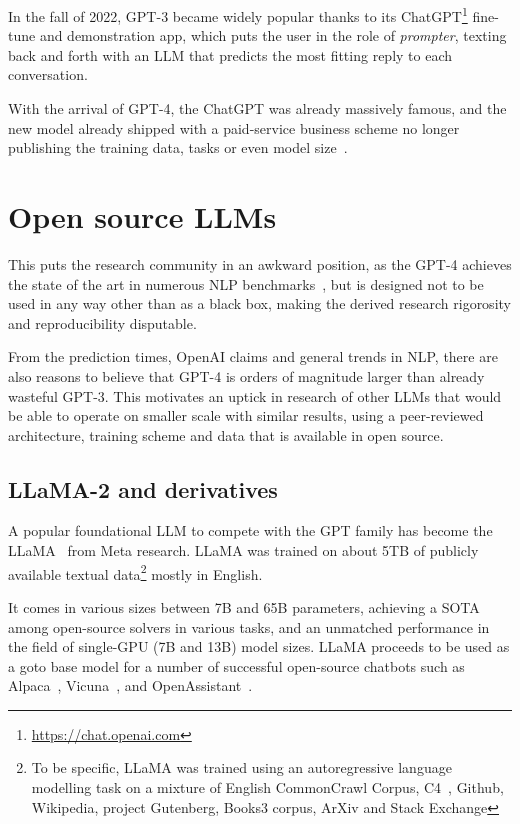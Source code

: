 In the fall of 2022, GPT-3 became widely popular thanks to its \textsf{ChatGPT}\footnote{\url{https://chat.openai.com}} fine-tune and demonstration app, which puts the user in the role of \textit{prompter}, texting back and forth with an LLM that predicts the most fitting reply to each conversation.

With the arrival of GPT-4, the \textsf{ChatGPT} was already massively famous, and the new model already shipped with a paid-service business scheme no longer publishing the training data, tasks or even model size~\cite{gpt4}.

\section{Open source LLMs}
This puts the research community in an awkward position, as the GPT-4 achieves the state of the art in numerous NLP benchmarks~\cite{gpt4,Liu_2023}, but is designed not to be used in any way other than as a black box, making the derived research rigorosity and reproducibility disputable.

From the prediction times, \textsf{OpenAI} claims and general trends in NLP, there are also reasons to believe that GPT-4 is orders of magnitude larger than already wasteful GPT-3.
This motivates an uptick in research of other LLMs that would be able to operate on smaller scale with similar results, using a peer-reviewed architecture, training scheme and data that is available in open source.

\subsection{LLaMA-2 and derivatives}
\label{sec:llama}

A popular foundational LLM to compete with the GPT family has become the \textsf{LLaMA}~\cite{llama} from \textsf{Meta research}. LLaMA was trained on about 5TB of publicly available  textual data\footnote{To be specific, LLaMA was trained using an autoregressive language modelling task on a mixture of English CommonCrawl Corpus, C4~\cite{raffel2020exploring}, Github, Wikipedia, project Gutenberg, Books3 corpus, ArXiv and Stack Exchange} mostly in English. 

It comes in various sizes between 7B and 65B parameters, achieving a SOTA among open-source solvers in various tasks, and an unmatched performance in the field of single-GPU (7B and 13B) model sizes.
LLaMA proceeds to be used as a goto base model for a number of successful open-source chatbots such as Alpaca~\cite{alpaca}, Vicuna~\cite{vicuna}, and OpenAssistant~\cite{openassistant}.

